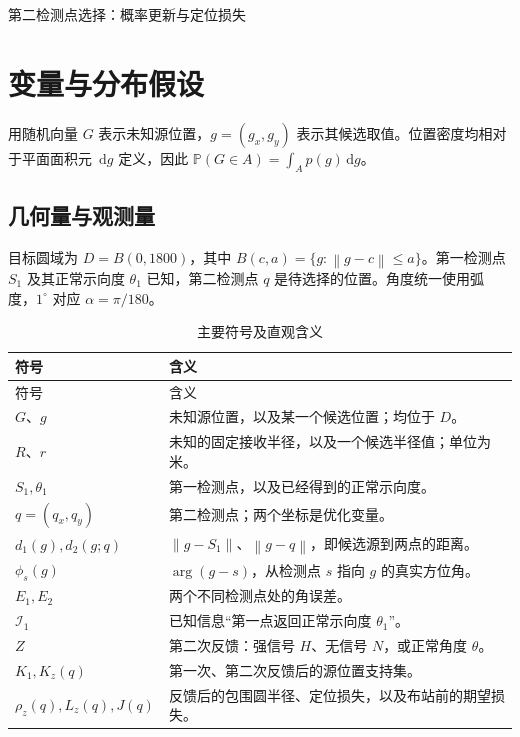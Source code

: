 \documentclass[UTF8,a4paper,zihao=-4,fontset=none]{ctexart}
\numberwithin{equation}{section}
\newcommand{\dd}{\,\mathrm d}
\newcommand{\Prob}{\mathbb P}
\newcommand{\norm}[1]{\left\lVert#1\right\rVert}
\begin{document}
\begin{center}
{\normalfont\LARGE\sffamily\mdseries 第二检测点选择：概率更新与定位损失}\par
\end{center}
\vspace{2em}

\section{变量与分布假设}
用随机向量 \(G\) 表示未知源位置，\(g=(g_x,g_y)\) 表示其候选取值。位置密度均相对于平面面积元 \(\dd g\) 定义，因此 \(\Prob(G\in A)=\int_A p(g)\dd g\)。

\subsection{几何量与观测量}
目标圆域为 \(D=B(0,1800)\)，其中 \(B(c,a)=\{g:\norm{g-c}\le a\}\)。第一检测点 \(S_1\) 及其正常示向度 \(\theta_1\) 已知，第二检测点 \(q\) 是待选择的位置。角度统一使用弧度，\(1^\circ\) 对应 \(\alpha=\pi/180\)。

\begin{longtable}{p{}p{}}
\caption{主要符号及直观含义}\label{tab:symbols}\\
\toprule 符号 & 含义 \\\midrule\endfirsthead
\toprule 符号 & 含义 \\\midrule\endhead
\bottomrule\endfoot
\(G\)、\(g\) & 未知源位置，以及某一个候选位置；均位于 \(D\)。\\
\(R\)、\(r\) & 未知的固定接收半径，以及一个候选半径值；单位为米。\\
\(S_1,\theta_1\) & 第一检测点，以及已经得到的正常示向度。\\
\(q=(q_x,q_y)\) & 第二检测点；两个坐标是优化变量。\\
\(d_1(g),d_2(g;q)\) & \(\norm{g-S_1}\)、\(\norm{g-q}\)，即候选源到两点的距离。\\
\(\phi_s(g)\) & \(\arg(g-s)\)，从检测点 \(s\) 指向 \(g\) 的真实方位角。\\
\(E_1,E_2\) & 两个不同检测点处的角误差。\\
\(\mathcal I_1\) & 已知信息“第一点返回正常示向度 \(\theta_1\)”。\\
\(Z\) & 第二次反馈：强信号 \(H\)、无信号 \(N\)，或正常角度 \(\theta\)。\\
\(K_1,K_z(q)\) & 第一次、第二次反馈后的源位置支持集。\\
\(\rho_z(q),L_z(q),J(q)\) & 反馈后的包围圆半径、定位损失，以及布站前的期望损失。\\
\end{longtable}
\end{document}
